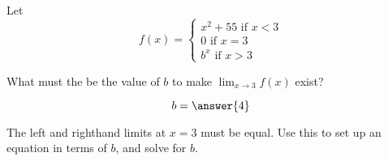\documentclass{ximera}
\author{Steven Gubkin}
\begin{document}
\begin{exercise}

Let \[f(x) = \begin{cases} x^2+55 \text{ if $x<3$}\\ 0 \text{ if $x=3$} \\ b^x \text{ if $x>3$}\end{cases}\]  
	
	What must the be the value of $b$ to make $\lim_{x \to 3} f(x)$ exist?
	
	\[b = \answer{4}\]
	
	\begin{hint}
		The left and righthand limits at $x=3$ must be equal.  Use this to set up an equation in terms of $b$, and solve for $b$.
	\end{hint}

\end{exercise}
\end{document}
